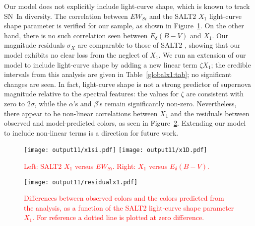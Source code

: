 \documentclass{aastex61}   	%
\begin{document}
\color{red}
Our model does not explicitly include light-curve shape, which is known to track SN~Ia diversity.
The correlation between $EW_{Si}$ and the SALT2 $X_1$ light-curve shape parameter is verified
for our sample, as shown in Figure~\ref{x1:fig}.
On the other hand, there is no such correlation seen between $E_\delta(B-V)$ and $X_1$. 
Our magnitude residuals $\sigma_X$ are comparable to those of SALT2
\citep{2010A&A...523A...7G}, showing that our model exhibits no clear loss from the neglect of $X_1$.
We  run an extension of our model to include light-curve shape by adding a new linear term $\zeta X_1$; the credible intervals
from this analysis are given in Table~\ref{globalx1:tab}; no significant changes are seen. 
In fact, light-curve shape is not a strong predictor of supernova magnitude relative to the spectral features: the values
for
$\zeta$ are consistent with zero to $2\sigma$, while the $\alpha$'s and $\beta$'s remain significantly
non-zero.  
Nevertheless, there 
appear to be non-linear correlations 
between $X_1$ and the residuals between observed and model-predicted colors, as seen in
Figure~\ref{x1res:fig}.
Extending our model to include non-linear terms is a direction for future work.
\begin{figure}[htbp] %
   \centering
   \texttt{[image: output11/x1si.pdf]}
   \texttt{[image: output11/x1D.pdf]}
    \caption{\textcolor{red}{Left: SALT2 $X_1$ versus $EW_{Si}$.  Right: $X_1$ versus $E_\delta(B-V)$.}
   \label{x1:fig}}
\end{figure}

\begin{figure}[htbp] %
   \centering
   \texttt{[image: output11/residualx1.pdf]}
    \caption{\textcolor{red}{Differences between observed colors and the colors predicted from the analysis, as a function
            of the SALT2 light-curve shape parameter $X_1$.  For reference a dotted line is plotted at zero difference.}
   \label{x1res:fig}}
\end{figure}
\end{document}

